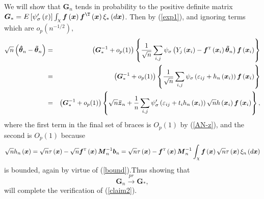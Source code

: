 \documentclass[times, authoryear, 12pt, twoside]{elsarticle}
\begin{document}
We will show that $\boldsymbol{G}_{n}$ tends in probability to the positive
definite matrix $\boldsymbol{G}_{\ast }=E\left[ \psi _{\sigma }^{\prime
}\left( \varepsilon \right) \right] \int_{\mathcal{\chi }}\boldsymbol{f}%
\left( \boldsymbol{x}\right) \boldsymbol{f}^{\T}\left( \boldsymbol{x}\right)
\xi _{\ast }\left( d\boldsymbol{x}\right) $. Then by (\ref{exp1}), and ignoring terms which are $o_p(n^{-1/2}),$%
\begin{eqnarray*}
\sqrt{n}\left( \boldsymbol{\hat{\theta}}_{n}-\boldsymbol{\tilde{\theta}}%
_{n}\right)  &=&\left( \boldsymbol{G}_{\ast }^{-1}+o_{p}(1)\right) \left\{ 
\frac{1}{\sqrt{n}}\sum_{i,j}\psi _{\sigma }\left( Y_{j}\left( \boldsymbol{x}%
_{i}\right) -\boldsymbol{f}^{{\mathrm{\scriptscriptstyle T}}}\left( 
\boldsymbol{x}_{i}\right) \boldsymbol{\tilde{\theta}}_{n}\right) \boldsymbol{%
f}\left( \boldsymbol{x}_{i}\right) \right\}  \\
&=&\left( \boldsymbol{G}_{\ast }^{-1}+o_{p}(1)\right) \left\{ \frac{1}{\sqrt{%
n}}\sum_{i,j}\psi _{\sigma }\left( \varepsilon _{ij}+h_{n}\left( \boldsymbol{%
x}_{i}\right) \right) \boldsymbol{f}\left( \boldsymbol{x}_{i}\right)
\right\}  \\
&=&\left( \boldsymbol{G}_{\ast }^{-1}+o_{p}(1)\right) \left\{ \sqrt{n}%
\boldsymbol{\bar{z}}_{n}+\frac{1}{n}\sum_{i,j}\psi _{\sigma }^{\prime
}\left( \varepsilon _{ij}+t_{i}h_{n}\left( \boldsymbol{x}_{i}\right) \right) 
\sqrt{n}h\left( \boldsymbol{x}_{i}\right) \boldsymbol{f}\left( \boldsymbol{x}%
_{i}\right) \right\} ,
\end{eqnarray*}%
where the first term in the final set of braces is $O_{p}(1)$ by (\ref{AN-z}), and the second
is $O_{p}(1)$ because 
\begin{equation*}
\sqrt{n}h_{n}\left( \boldsymbol{x}\right) =\sqrt{n}\tau \left( \boldsymbol{x}%
\right) -\sqrt{n}\boldsymbol{f}^{{\mathrm{\scriptscriptstyle T}}}\left( 
\boldsymbol{x}\right) \boldsymbol{M}_{n}^{-1}\boldsymbol{b}_{n}=\sqrt{n}%
\tau \left( \boldsymbol{x}\right) -\boldsymbol{f}^{{\mathrm{%
\scriptscriptstyle T}}}\left( \boldsymbol{x}\right) \boldsymbol{M}%
_{n}^{-1}\int_{\mathcal{\chi }}\boldsymbol{f}\left( \boldsymbol{x}\right) 
\sqrt{n}\tau \left( \boldsymbol{x}\right) \xi _{n}\left( d\boldsymbol{x}%
\right) 
\end{equation*}%
is bounded, again by virtue of (\ref{bound}).\bigskip  Thus showing that \begin{equation}
\boldsymbol{G}_{n}\overset{pr}{\rightarrow }\boldsymbol{G}_{\ast },
\label{A-limit}
\end{equation}%
will complete the verification of (\ref{claim2}).
\end{document}
